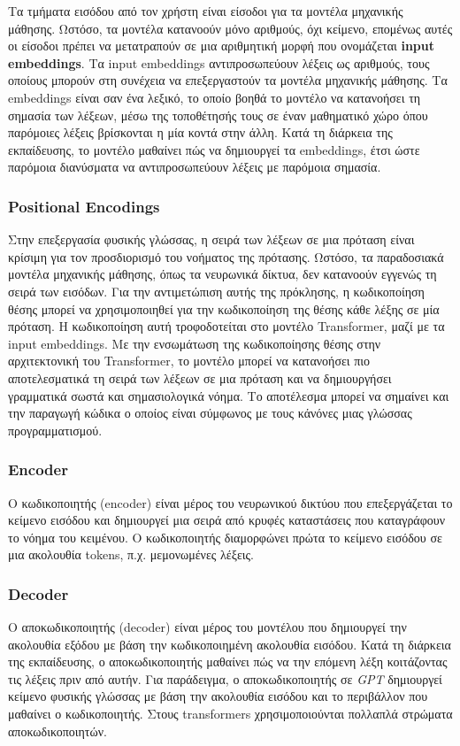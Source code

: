 \documentclass[12pt]{extarticle}
\begin{document}
Τα τμήματα εισόδου από τον χρήστη είναι είσοδοι για τα μοντέλα μηχανικής μάθησης. Ωστόσο, τα μοντέλα κατανοούν μόνο αριθμούς, όχι κείμενο, επομένως αυτές οι είσοδοι πρέπει να μετατραπούν σε μια αριθμητική μορφή που ονομάζεται \textbf{input embeddings}. Tα input embeddings αντιπροσωπεύουν λέξεις ως αριθμούς, τους οποίους μπορούν στη συνέχεια να επεξεργαστούν τα μοντέλα μηχανικής μάθησης. Τα embeddings είναι σαν ένα λεξικό, το οποίο βοηθά το μοντέλο να κατανοήσει τη σημασία των λέξεων, μέσω της τοποθέτησής τους σε έναν μαθηματικό χώρο όπου παρόμοιες λέξεις βρίσκονται η μία κοντά στην άλλη. Κατά τη διάρκεια της εκπαίδευσης, το μοντέλο μαθαίνει πώς να δημιουργεί τα embeddings, έτσι ώστε παρόμοια διανύσματα να αντιπροσωπεύουν λέξεις με παρόμοια σημασία.

\subsubsection{Positional Encodings}

Στην επεξεργασία φυσικής γλώσσας, η σειρά των λέξεων σε μια πρόταση είναι κρίσιμη για τον προσδιορισμό του νοήματος της πρότασης. Ωστόσο, τα παραδοσιακά μοντέλα μηχανικής μάθησης, όπως τα νευρωνικά δίκτυα, δεν κατανοούν εγγενώς τη σειρά των εισόδων. Για την αντιμετώπιση αυτής της πρόκλησης, η κωδικοποίηση θέσης μπορεί να χρησιμοποιηθεί για την κωδικοποίηση της θέσης κάθε λέξης σε μία πρόταση. Η κωδικοποίηση αυτή τροφοδοτείται στο μοντέλο Transformer, μαζί με τα input embeddings. Με την ενσωμάτωση της κωδικοποίησης θέσης στην αρχιτεκτονική του Transformer, το μοντέλο μπορεί να κατανοήσει πιο αποτελεσματικά τη σειρά των λέξεων σε μια πρόταση και να δημιουργήσει γραμματικά σωστά και σημασιολογικά νόημα.
Το  αποτέλεσμα μπορεί να σημαίνει και την παραγωγή κώδικα ο οποίος είναι 
σύμφωνος με τους κάνόνες μιας γλώσσας προγραμματισμού. 

\subsubsection{Encoder}

Ο κωδικοποιητής (encoder) είναι μέρος του νευρωνικού δικτύου που επεξεργάζεται το κείμενο εισόδου και δημιουργεί μια σειρά από κρυφές καταστάσεις που καταγράφουν το νόημα του κειμένου. Ο κωδικοποιητής διαμορφώνει πρώτα το κείμενο εισόδου σε μια ακολουθία tokens, π.χ. μεμονωμένες λέξεις.

\subsubsection{Decoder}
Ο αποκωδικοποιητής (decoder) είναι μέρος του μοντέλου που δημιουργεί την ακολουθία εξόδου με βάση την κωδικοποιημένη ακολουθία εισόδου. Κατά τη διάρκεια της εκπαίδευσης, ο αποκωδικοποιητής μαθαίνει πώς να  την επόμενη λέξη κοιτάζοντας τις λέξεις πριν από αυτήν. Για παράδειγμα, ο αποκωδικοποιητής σε \textit{GPT} δημιουργεί κείμενο φυσικής γλώσσας με βάση την ακολουθία εισόδου και το περιβάλλον που μαθαίνει ο κωδικοποιητής. Στους transformers χρησιμοποιούνται πολλαπλά στρώματα αποκωδικοποιητών.
\end{document}
